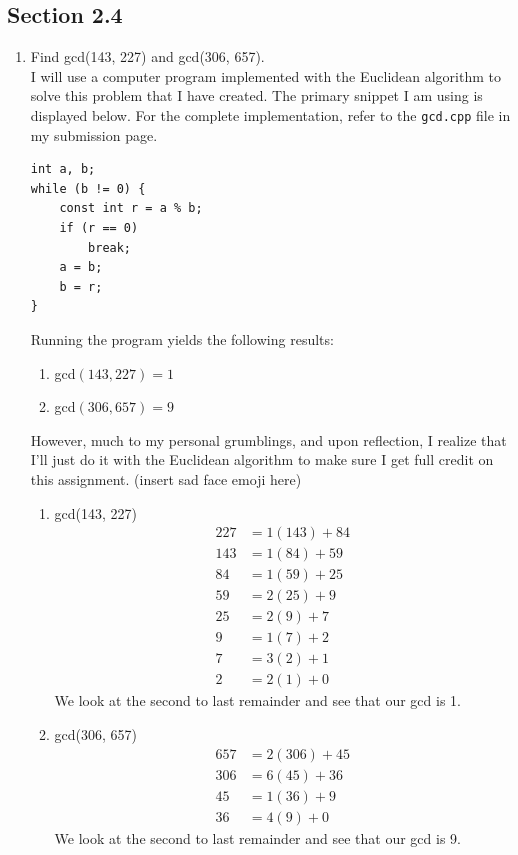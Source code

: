 \documentclass[10pt,oneside]{book}
\newcommand{\n}{\vspace{0.15cm}\\}
\begin{document}
\subsection*{Section 2.4}
\begin{enumerate}
    \item Find gcd(143, 227) and gcd(306, 657).\n
    I will use a computer program implemented with the Euclidean algorithm to solve this problem that I have created. The primary snippet I am using is displayed below. For the complete implementation, refer to the \texttt{gcd.cpp} file in my submission page.
\begin{verbatim}
int a, b;
while (b != 0) {
    const int r = a % b;
    if (r == 0)
        break;
    a = b;
    b = r;
}
\end{verbatim}
    Running the program yields the following results:
    \begin{enumerate}
        \item gcd$(143, 227) = 1$
        \item gcd$(306,657) = 9$
    \end{enumerate}
    \pagebreak
    However, much to my personal grumblings, and upon reflection, I realize that I'll just do it with the Euclidean algorithm to make sure I get full credit on this assignment. (insert sad face emoji here)
    \begin{enumerate}
        \item gcd(143, 227)
        \begin{align*}
            227 &= 1(143) + 84\\
            143 &= 1(84) + 59\\
            84 &= 1(59) + 25\\
            59 &= 2(25) + 9 \\
            25 &= 2(9) + 7 \\
            9 &= 1(7) + 2 \\
            7 &= 3(2) + 1 \\
            2 &= 2(1) + 0
        \end{align*}
        We look at the second to last remainder and see that our gcd is 1.
        \item  gcd(306, 657)
        \begin{align*}
            657 &=  2(306) + 45\\
            306 &= 6(45) + 36 \\
            45 &= 1(36) + 9 \\
            36 &= 4(9) + 0
        \end{align*}
        We look at the second to last remainder and see that our gcd is 9.
    \end{enumerate}

\end{enumerate}
\end{document}
